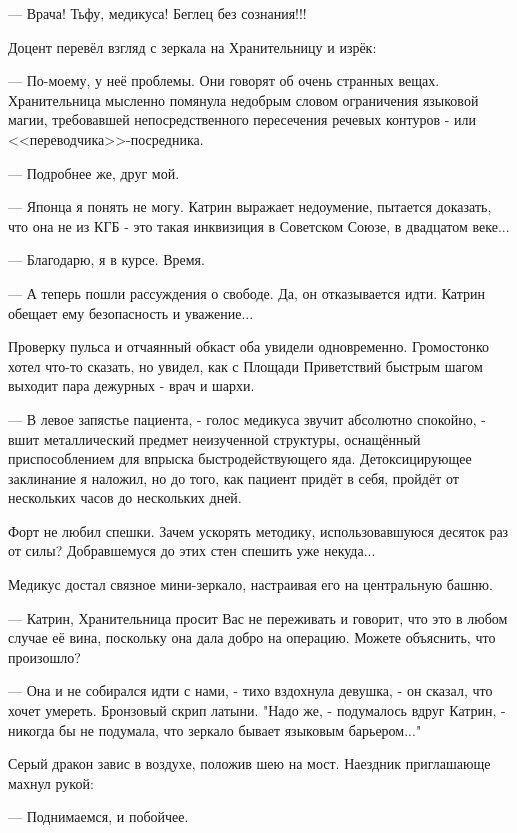 --- Врача! Тьфу, медикуса! Беглец без сознания!!!




Доцент перевёл взгляд с зеркала на Хранительницу и изрёк:

--- По-моему, у неё проблемы. Они говорят об очень странных вещах.
Хранительница мысленно помянула недобрым словом ограничения языковой магии,
требовавшей непосредственного пересечения речевых контуров - или <<переводчика>>-посредника.

--- Подробнее же, друг мой.

--- Японца я понять не могу. Катрин выражает недоумение, пытается доказать, что она не из КГБ - это такая инквизиция в Советском Союзе, в двадцатом веке...

--- Благодарю, я в курсе. Время.

--- А теперь пошли рассуждения о свободе. Да, он отказывается идти. Катрин обещает ему безопасность и уважение...

Проверку пульса и отчаянный обкаст оба увидели одновременно. Громостонко хотел что-то сказать, но увидел, как с Площади Приветствий быстрым шагом выходит пара дежурных - врач и шархи.


--- В левое запястье пациента, - голос медикуса звучит абсолютно спокойно, - вшит металлический предмет неизученной структуры, оснащённый приспособлением для впрыска быстродействующего яда. Детоксицирующее заклинание я наложил, но до того, как пациент придёт в себя, пройдёт от нескольких часов до нескольких дней.

Форт не любил спешки. Зачем ускорять методику, использовавшуюся десяток раз от силы? Добравшемуся до этих стен спешить уже некуда...

Медикус достал связное мини-зеркало, настраивая его на центральную башню.

--- Катрин, Хранительница просит Вас не переживать и говорит, что это в любом случае её вина, поскольку она дала добро на операцию. Можете объяснить, что произошло?

--- Она и не собирался идти с нами, - тихо вздохнула девушка, - он сказал, что хочет умереть.
Бронзовый скрип латыни.
"Надо же, - подумалось вдруг Катрин, - никогда бы не подумала, что зеркало бывает языковым барьером..."


Серый дракон завис в воздухе, положив шею на мост. Наездник приглашающе махнул рукой:

--- Поднимаемся, и побойчее.


